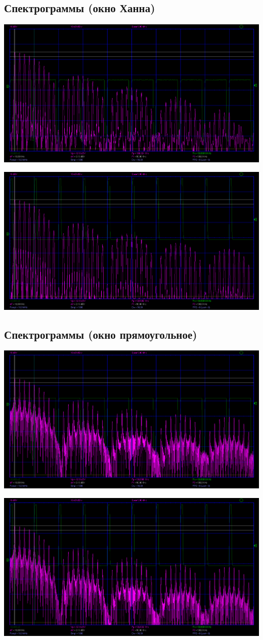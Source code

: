 \documentclass[12pt,a4paper]{article}
\begin{document}
\subsection*{Спектрограммы (окно Ханна)}
\vspace*{20pt}
\begin{center}
	\includegraphics[width=.8\linewidth]{data/3-4_hanna_10MHZ_9mu-10mu}\hfill
\end{center}	
\begin{center}
	\includegraphics[width=.8\linewidth]{data/3-4_hanna_10MHZ_1mu-10mu}\hfill
\end{center}	

\newpage

\subsection*{Спектрограммы (окно прямоугольное)}
\vspace*{20pt}
\begin{center}
	\includegraphics[width=.8\linewidth]{data/3-4_rect_10MHZ_9mu-10mu}\hfill
\end{center}	
\begin{center}
	\includegraphics[width=.8\linewidth]{data/3-4_rect_10MHZ_1mu-10mu}\hfill
\end{center}	

\newpage
\end{document}
